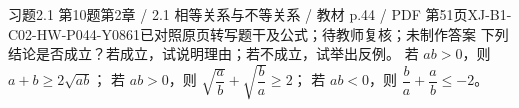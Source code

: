 \par\noindent\begin{minipage}{\linewidth}
\begin{bankitem}{习题2.1 第10题}{第2章 / 2.1 相等关系与不等关系 / 教材 p.44 / PDF 第51页}{XJ-B1-C02-HW-P044-Y0861}{已对照原页转写题干及公式；待教师复核；未制作答案}
下列结论是否成立？若成立，试说明理由；若不成立，试举出反例。
若 $ab>0$，则 $a+b\ge2\sqrt{ab}$；
若 $ab>0$，则 $\sqrt{\dfrac ab}+\sqrt{\dfrac ba}\ge2$；
若 $ab<0$，则 $\dfrac ba+\dfrac ab\le-2$。
\end{bankitem}
\end{minipage}\par\medskip
